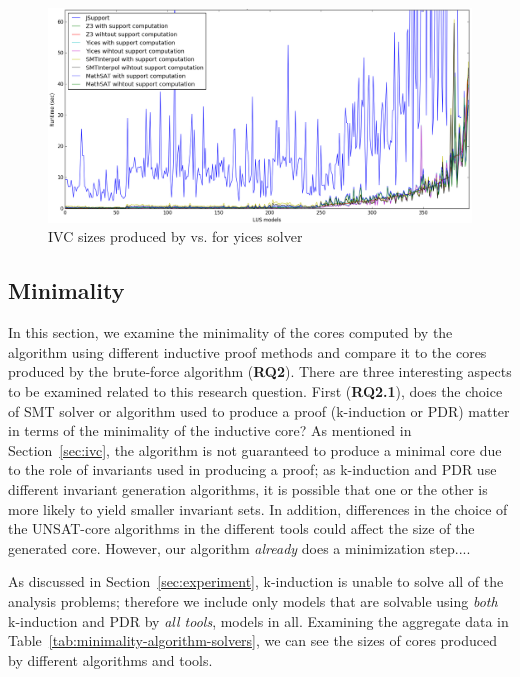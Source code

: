 \begin{figure}
  \centering
  \includegraphics[width=\textwidth]{figs/runtimeAll.png}
  \caption{IVC sizes produced by \ucalg vs. \ucbfalg for yices solver}
  \label{fig:minimality-all}
\end{figure}

\subsection{Minimality}
\label{sec:minimality}
In this section, we examine the minimality of the cores computed by the \ucalg algorithm using different inductive proof methods and compare it to the cores produced by the brute-force algorithm (\textbf{RQ2}).  There are three interesting aspects to be examined related to this research question.  First (\textbf{RQ2.1}), does the choice of SMT solver or algorithm used to produce a proof (k-induction or PDR) matter in terms of the minimality of the inductive core?   As mentioned in Section~\ref{sec:ivc}, the \ucalg algorithm is not guaranteed to produce a minimal core due to the role of invariants used in producing a proof; as k-induction and PDR use different invariant generation algorithms, it is possible that one or the other is more likely to yield smaller invariant sets.  In addition, differences in the choice of the UNSAT-core algorithms in the different tools could affect the size of the generated core.  However, our algorithm {\em already} does a minimization step....

As discussed in Section~\ref{sec:experiment}, k-induction is unable to solve all of the analysis problems; therefore we include only models that are solvable using {\em both} k-induction and PDR by {\em all tools},  models in all.  Examining the aggregate data in Table~\ref{tab:minimality-algorithm-solvers}, we can see the sizes of cores produced by different algorithms and tools.

